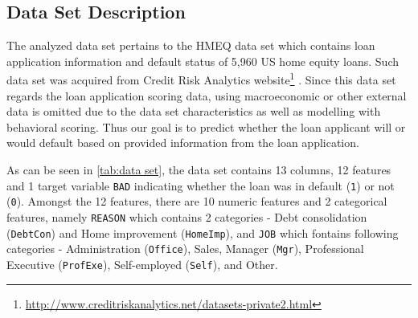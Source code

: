 \subsection{Data Set Description}
The analyzed data set pertains to the HMEQ data set which contains loan application information and default status of 5,960 US home equity loans. Such data set was acquired from Credit Risk Analytics website\footnote{\url{http://www.creditriskanalytics.net/datasets-private2.html}} \citep{baesens2016credit}. Since this data set regards the loan application scoring data, using macroeconomic or other external data is omitted due to the data set characteristics as well as modelling with behavioral scoring.
Thus our goal is to predict whether the loan applicant will or would default based on provided information from the loan application.

As can be seen in \autoref{tab:data set}, the data set contains 13 columns, 12 features and 1 target variable \texttt{BAD} indicating whether the loan was in default (\texttt{1}) or not (\texttt{0}). 
Amongst the 12 features, there are 10 numeric features and 2 categorical features, namely \texttt{REASON} which contains 2 categories - Debt consolidation (\texttt{DebtCon}) and Home improvement (\texttt{HomeImp}), and \texttt{JOB} which fontains following categories - Administration (\texttt{Office}), Sales, Manager (\texttt{Mgr}), Professional Executive (\texttt{ProfExe}), Self-employed (\texttt{Self}), and Other.


